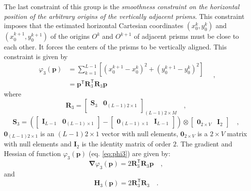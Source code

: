 The last constraint of this group is the \textit{smoothness constraint on the horizontal position of 
the arbitrary origins of the vertically adjacent prisms}. This constraint imposes that the estimated horizontal 
Cartesian coordinates $(x_{0}^{k}, y_{0}^{k})$ and $(x_{0}^{k+1}, y_{0}^{k+1})$ of the origins $O^{k}$ and $O^{k+1}$ 
of adjacent prisms must be close to each other. It forces the centers of the prisms to be vertically aligned. This constraint 
is given by
\begin{equation}\label{eq:phi3}
\begin{split}
\varphi_{3}(\mathbf{p}) &= \sum\limits^{L-1}_{k=1}\left[\left(x_{0}^{k+1} - x_{0}^{k}\right)^2 + \left(y_{0}^{k+1} - y_{0}^{k}\right)^2 \right] \\
&= \mathbf{p}^{\mathsf{T}} \mathbf{R}^{\mathsf{T}}_{3}\mathbf{R}_{3}\mathbf{p}
\end{split} \quad ,
\end{equation}
where 
\begin{equation}
\mathbf{R}_{3} = 
\begin{bmatrix}
\mathbf{S}_{3} & \mathbf{0}_{(L-1)2 \times 1} \\
\end{bmatrix}_{(L-1)2 \times M} \quad ,
\label{eq:R3-matrix}
\end{equation}
\begin{equation}
\mathbf{S}_{3} =
\left( 
\begin{bmatrix} \mathbf{I}_{L-1} & \mathbf{0}_{(L-1) \times 1} \end{bmatrix} -
\begin{bmatrix} \mathbf{0}_{(L-1) \times 1} & \mathbf{I}_{L-1} \end{bmatrix} 
\right) \otimes 
\begin{bmatrix} \mathbf{0}_{2 \times V} & \mathbf{I}_{2} \end{bmatrix} \quad ,
\label{eq:S3-matrix}
\end{equation}
$\mathbf{0}_{(L-1)2 \times 1}$ is an $(L-1)2 \times 1$ vector with null elements,
$\mathbf{0}_{2 \times V}$ is a $2 \times V$ matrix with null elements and 
$\mathbf{I}_{2}$ is the identity matrix of order $2$. The gradient and Hessian of function $\varphi_{3}(\mathbf{p})$ (eq. \ref{eq:phi3}) are given by:
\begin{equation}\label{eq:phi3_grad}
\boldsymbol{\nabla}\varphi_{3}(\mathbf{p}) = 2 \mathbf{R}^{\mathsf{T}}_{3}\mathbf{R}_{3}\mathbf{p} \quad ,
\end{equation}
and
\begin{equation}\label{eq:phi3_hessian}
\mathbf{H}_{3}(\mathbf{p}) = 2 \mathbf{R}^{\mathsf{T}}_{3}\mathbf{R}_{3} \quad .
\end{equation}


